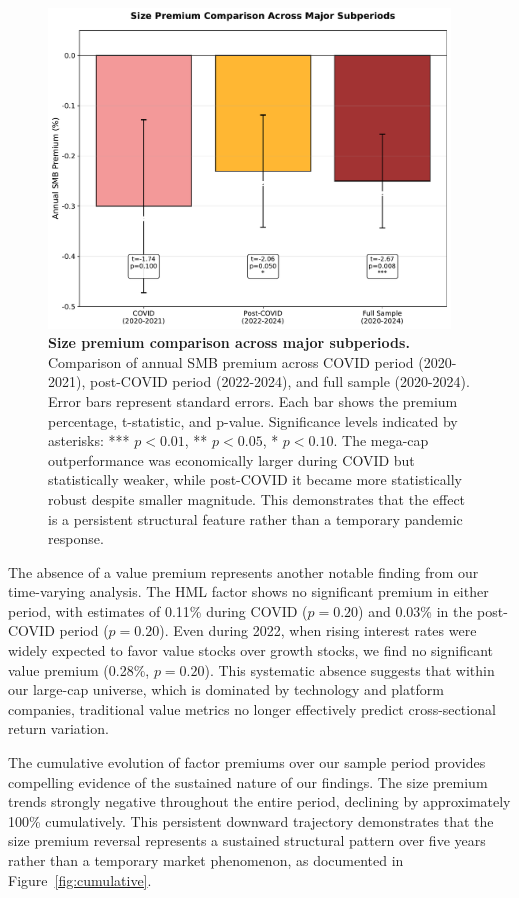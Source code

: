 \documentclass[10pt,letterpaper]{article}
\begin{document}
\begin{figure}[!h]
\centering
\includegraphics[width=0.95\textwidth]{figures/fig8_subperiod_comparison.pdf}
\caption{\textbf{Size premium comparison across major subperiods.}
Comparison of annual SMB premium across COVID period (2020-2021), post-COVID period (2022-2024), and full sample (2020-2024). Error bars represent standard errors. Each bar shows the premium percentage, t-statistic, and p-value. Significance levels indicated by asterisks: *** $p<0.01$, ** $p<0.05$, * $p<0.10$. The mega-cap outperformance was economically larger during COVID but statistically weaker, while post-COVID it became more statistically robust despite smaller magnitude. This demonstrates that the effect is a persistent structural feature rather than a temporary pandemic response.}
\label{fig:subperiod_comparison}
\end{figure}

The absence of a value premium represents another notable finding from our time-varying analysis. The HML factor shows no significant premium in either period, with estimates of 0.11\% during COVID ($p=0.20$) and 0.03\% in the post-COVID period ($p=0.20$). Even during 2022, when rising interest rates were widely expected to favor value stocks over growth stocks, we find no significant value premium (0.28\%, $p=0.20$). This systematic absence suggests that within our large-cap universe, which is dominated by technology and platform companies, traditional value metrics no longer effectively predict cross-sectional return variation.

The cumulative evolution of factor premiums over our sample period provides compelling evidence of the sustained nature of our findings. The size premium trends strongly negative throughout the entire period, declining by approximately 100\% cumulatively. This persistent downward trajectory demonstrates that the size premium reversal represents a sustained structural pattern over five years rather than a temporary market phenomenon, as documented in Figure~\ref{fig:cumulative}.
\end{document}
